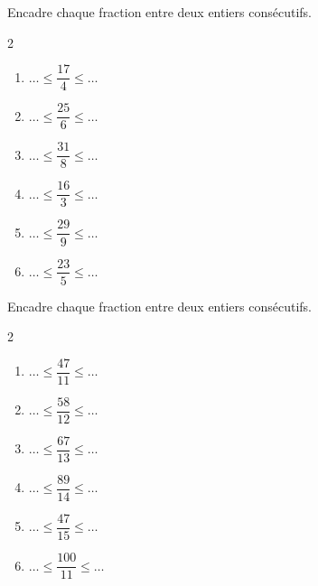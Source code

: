 \documentclass[11pt]{article}
\begin{document}
\begin{exercice}
Encadre chaque fraction entre deux entiers consécutifs.
\begin{multicols}{2}
\begin{enumerate}[itemsep=.4em]
\item $\ldots \leqslant \dfrac{17}{4} \leqslant \ldots$
\item $\ldots \leqslant \dfrac{25}{6} \leqslant \ldots$
\item $\ldots \leqslant \dfrac{31}{8} \leqslant \ldots$
\item $\ldots \leqslant \dfrac{16}{3} \leqslant \ldots$
\item $\ldots \leqslant \dfrac{29}{9} \leqslant \ldots$
\item $\ldots \leqslant \dfrac{23}{5} \leqslant \ldots$
\end{enumerate}
\end{multicols}
\end{exercice}

\begin{exercice}
Encadre chaque fraction entre deux entiers consécutifs.
\begin{multicols}{2}
\begin{enumerate}[itemsep=.4em]
\item $\ldots \leqslant \dfrac{47}{11} \leqslant \ldots$
\item $\ldots \leqslant \dfrac{58}{12} \leqslant \ldots$
\item $\ldots \leqslant \dfrac{67}{13} \leqslant \ldots$
\item $\ldots \leqslant \dfrac{89}{14} \leqslant \ldots$
\item $\ldots \leqslant \dfrac{47}{15} \leqslant \ldots$
\item $\ldots \leqslant \dfrac{100}{11} \leqslant \ldots$
\end{enumerate}
\end{multicols}
\end{exercice}
\end{document}
